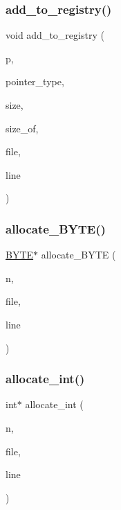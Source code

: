 \subsubsection{\texorpdfstring{add\+\_\+to\+\_\+registry()}{add\_to\_registry()}}
{\footnotesize\ttfamily void add\+\_\+to\+\_\+registry (\begin{DoxyParamCaption}\item[{void $\ast$}]{p,  }\item[{int}]{pointer\+\_\+type,  }\item[{int}]{size,  }\item[{int}]{size\+\_\+of,  }\item[{const char $\ast$}]{file,  }\item[{int}]{line }\end{DoxyParamCaption})}

\mbox{\label{_g_a_l_o_i_s_2memory_8_c_aac4b971fcef6702a53062bde2fd6b755}} 
\subsubsection{\texorpdfstring{allocate\+\_\+\+B\+Y\+T\+E()}{allocate\_BYTE()}}
{\footnotesize\ttfamily \mbox{\hyperlink{galois_8h_ab6cc7b4aeb6ea31aba2b3fbfc83ff5e6}{B\+Y\+TE}}$\ast$ allocate\+\_\+\+B\+Y\+TE (\begin{DoxyParamCaption}\item[{\mbox{\hyperlink{galois_8h_a09fddde158a3a20bd2dcadb609de11dc}{I\+NT}}}]{n,  }\item[{const char $\ast$}]{file,  }\item[{int}]{line }\end{DoxyParamCaption})}

\mbox{\label{_g_a_l_o_i_s_2memory_8_c_a9b47024ab51fba0a4caa91b135180600}} 
\subsubsection{\texorpdfstring{allocate\+\_\+int()}{allocate\_int()}}
{\footnotesize\ttfamily int$\ast$ allocate\+\_\+int (\begin{DoxyParamCaption}\item[{\mbox{\hyperlink{galois_8h_a09fddde158a3a20bd2dcadb609de11dc}{I\+NT}}}]{n,  }\item[{const char $\ast$}]{file,  }\item[{int}]{line }\end{DoxyParamCaption})}

